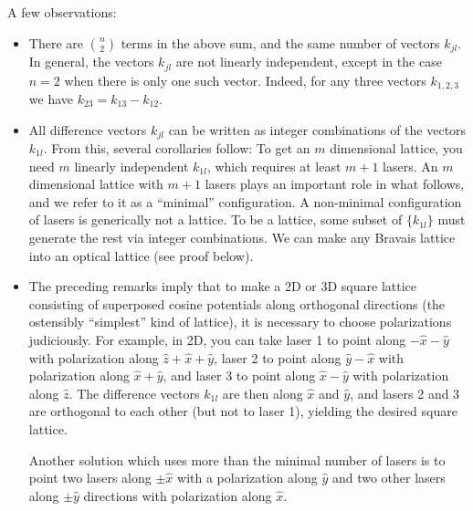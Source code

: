 \documentclass[aps,prb,floatfix,amsmath,amssymb,groupedaddress]{revtex4}
\begin{document}
A few observations:
\begin{itemize}
\item There are $\binom{n}{2}$ terms in the above sum, and the same number of vectors $k_{jl}$.  In general, the vectors $k_{jl}$ are not linearly independent, except in the case $n=2$ when there is only one such vector.   Indeed, for any three vectors $k_{1,2,3}$ we have $k_{23} = k_{13}-k_{12}$.  
\item All difference vectors $k_{jl}$ can be written as integer combinations of the vectors $k_{1l}$.  From this, several corollaries follow: 
\subitem To get an $m$ dimensional lattice, you need $m$ linearly independent $k_{1l}$, which requires at least $m+1$ lasers.  An $m$ dimensional lattice with $m+1$ lasers plays an important role in what follows, and we refer to it as a ``minimal'' configuration.  
\subitem A non-minimal configuration of lasers is generically not a lattice.  To be a lattice, some subset of $\{k_{1l}\}$ must generate the rest via integer combinations. 
\subitem We can make any Bravais lattice into an optical lattice (see proof below). 
\item The preceding remarks imply that to make a 2D or 3D square lattice consisting of superposed cosine potentials along orthogonal directions (the ostensibly ``simplest'' kind of lattice), it is necessary to choose polarizations judiciously.  For example, in 2D, you can take laser 1 to point along $-\hat{x}-\hat{y}$ with polarization along $\hat{z}+\hat{x}+\hat{y}$, laser 2 to point along $\hat{y}-\hat{x}$ with polarization along $\hat{x}+\hat{y}$, and laser 3 to point along $\hat{x}-\hat{y}$ with polarization along $\hat{z}$.  The difference vectors $k_{1l}$ are then along $\hat{x}$ and $\hat{y}$, and lasers 2 and 3 are orthogonal to each other (but not to laser 1), yielding the desired square lattice.   

Another solution which uses more than the minimal number of lasers is to point two lasers along $\pm\hat{x}$ with a polarization along $\hat{y}$ and two other lasers along $\pm \hat{y}$ directions with polarization along $\hat{x}$.
\end{itemize}

\end{document}
